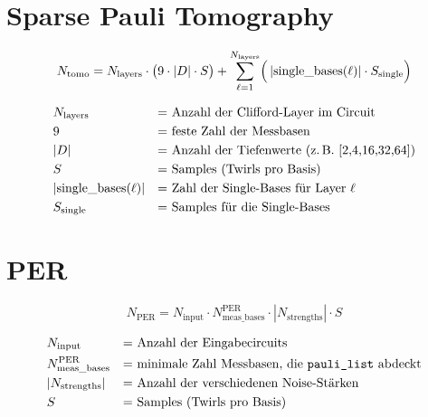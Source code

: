 \documentclass[12pt]{article}
\begin{document}
	\section{Sparse Pauli Tomography}
	
	\[
	N_{\mathrm{tomo}}
	= N_{\mathrm{layers}} \cdot \bigl( 9 \cdot |D| \cdot S \bigr)
	+ \sum_{\ell=1}^{N_{\mathrm{layers}}} 
	\Bigl( \, \lvert \text{single\_bases}(\ell) \rvert \cdot S_{\mathrm{single}} \Bigr)
	\]
	
	\begin{align*}
		&N_{\mathrm{layers}} && \text{= Anzahl der Clifford-Layer im Circuit} \\
		&9 && \text{= feste Zahl der Messbasen} \\
		&|D| && \text{= Anzahl der Tiefenwerte (z.\,B. [2,4,16,32,64])} \\
		&S && \text{= Samples (Twirls pro Basis)} \\
		&|\text{single\_bases}(\ell)| && \text{= Zahl der Single-Bases für Layer $\ell$} \\
		&S_{\mathrm{single}} && \text{= Samples für die Single-Bases}
	\end{align*}
	
	\section{PER} 
	\[
	N_{\mathrm{PER}}
	= N_{\mathrm{input}} \cdot N_{\mathrm{meas\_bases}}^{\mathrm{PER}} \cdot |N_{\mathrm{strengths}}| \cdot S
	\]
	
	\begin{align*}
		&N_{\mathrm{input}} && \text{= Anzahl der Eingabecircuits} \\
		&N_{\mathrm{meas\_bases}}^{\mathrm{PER}} && \text{= minimale Zahl Messbasen, die \texttt{pauli\_list} abdeckt} \\
		&|N_{\mathrm{strengths}}| && \text{= Anzahl der verschiedenen Noise-Stärken} \\
		&S && \text{= Samples (Twirls pro Basis)}
	\end{align*}
	
\end{document}
